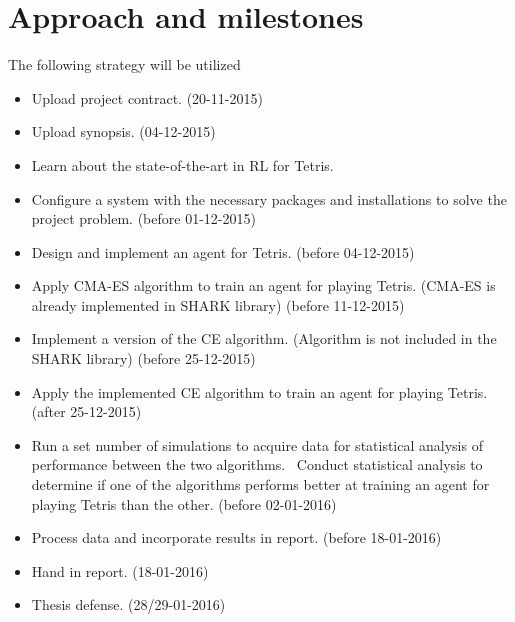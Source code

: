 \section*{Approach and milestones}
The following strategy will be utilized
\begin{itemize}
\item Upload project contract. (20-11-2015)
\item Upload synopsis. (04-12-2015)
\item Learn about the state-of-the-art in RL for Tetris.
\item Configure a system with the necessary packages and installations to solve the project problem. (before 01-12-2015)
\item Design and implement an agent for Tetris. (before 04-12-2015)
\item Apply CMA-ES algorithm to train an agent for playing Tetris. (CMA-ES is already implemented in SHARK library)
 (before 11-12-2015)
\item Implement a version of the CE algorithm. (Algorithm is not included in the SHARK library) (before 25-12-2015)
\item Apply the implemented CE algorithm to train an agent for playing Tetris. (after 25-12-2015)
\item Run a set number of simulations to acquire data for statistical analysis of performance between the two algorithms.
\ Conduct statistical analysis to determine if one of the algorithms performs better at training an agent for playing Tetris than the other. (before 02-01-2016)
\item Process data and incorporate results in report. (before 18-01-2016)
\item Hand in report. (18-01-2016)
\item Thesis defense. (28/29-01-2016)
\end{itemize}